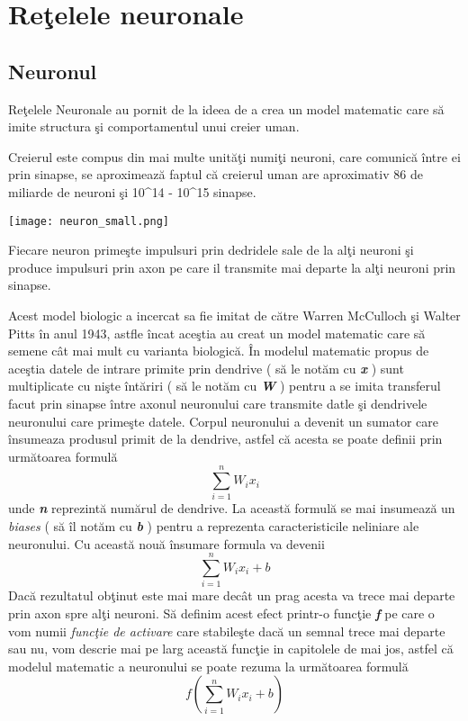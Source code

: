 \chapter{Re\c{t}elele neuronale}

\section{Neuronul}

Re\c{t}elele Neuronale au pornit de la ideea de a crea un model matematic care s\u{a} imite structura \c{s}i comportamentul unui creier uman.
\par
Creierul este compus din mai multe unit\u{a}\c{t}i numi\c{t}i neuroni, care comunic\u{a} \^{i}ntre ei prin sinapse, se aproximeaz\u{a} faptul c\u{a} creierul uman are aproximativ 86 de miliarde de neuroni \c{s}i 10^{14} - 10^{15}  sinapse.

\texttt{[image: neuron\_small.png]}

Fiecare neuron prime\c{s}te impulsuri prin dedridele sale de la al\c{t}i neuroni \c{s}i produce impulsuri prin axon pe care il transmite mai departe la al\c{t}i neuroni prin sinapse.

\par

Acest model biologic a incercat sa fie imitat de c\u{a}tre Warren McCulloch \c{s}i Walter Pitts \^{i}n anul 1943, astfle \^{i}ncat ace\c{s}tia au creat un model matematic care s\u{a} semene c\^{a}t mai mult cu varianta biologic\u{a}. \^{I}n modelul matematic propus de ace\c{s}tia datele de intrare primite prin dendrive ( s\u{a} le not\u{a}m cu \textbf{\textit{x}} ) sunt multiplicate cu ni\c{s}te \^{i}nt\u{a}riri ( s\u{a} le not\u{a}m cu \textbf{\textit{W}} ) pentru a se imita transferul facut prin sinapse \^{i}ntre axonul neuronului care transmite datle \c{s}i dendrivele neuronului care prime\c{s}te datele. Corpul neuronului a devenit un sumator care \^{i}nsumeaza produsul primit de la dendrive, astfel c\u{a} acesta se poate definii prin urm\u{a}toarea formul\u{a}  $$ \sum_{i=1}^{n} W_i x_i $$ unde \textbf{\textit{n}} reprezint\u{a} num\u{a}rul de dendrive. La aceast\u{a} formul\u{a} se mai insumeaz\u{a} un \textit{biases} ( s\u{a} \^{i}l not\u{a}m cu \textbf{\textit{b}} ) pentru a reprezenta caracteristicile neliniare ale neuronului. Cu aceast\u{a} nou\u{a} \^{i}nsumare formula va devenii $$ \sum_{i=1}^{n} W_i x_i + b $$
Dac\u{a} rezultatul ob\c{t}inut este mai mare dec\^{a}t un prag acesta va trece mai departe prin axon spre al\c{t}i neuroni. S\u{a} definim acest efect printr-o func\c{t}ie \textbf{\textit{f}} pe care o vom numii \textit{func\c{t}ie de activare} care stabile\c{s}te dac\u{a} un semnal trece mai departe sau nu, vom descrie mai pe larg aceast\u{a} func\c{t}ie in capitolele de mai jos, astfel c\u{a} modelul matematic a neuronului se poate rezuma la urm\u{a}toarea formul\u{a} 
$$f( \sum_{i=1}^{n} W_i x_i + b ) $$

